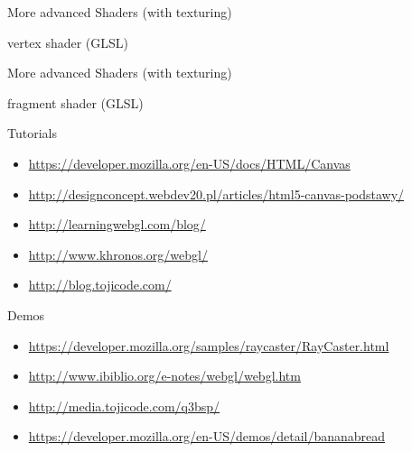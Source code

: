 \documentclass{beamer}
\begin{document}
\begin{frame}{More advanced Shaders (with texturing)}

vertex shader (GLSL)


\end{frame}


\begin{frame}{More advanced Shaders (with texturing)}

fragment shader (GLSL)


\end{frame}

\begin{frame}{Tutorials}
\begin{itemize}
\item \url{https://developer.mozilla.org/en-US/docs/HTML/Canvas}
\item \url{http://designconcept.webdev20.pl/articles/html5-canvas-podstawy/}
\item \url{http://learningwebgl.com/blog/}
\item \url{http://www.khronos.org/webgl/}
\item \url{http://blog.tojicode.com/}
\end{itemize}

\end{frame}

\begin{frame}{Demos}
\begin{itemize}
\item \url{https://developer.mozilla.org/samples/raycaster/RayCaster.html}
\item \url{http://www.ibiblio.org/e-notes/webgl/webgl.htm}
\item \url{http://media.tojicode.com/q3bsp/}
\item \url{https://developer.mozilla.org/en-US/demos/detail/bananabread}
\end{itemize}

\end{frame}
\end{document}
